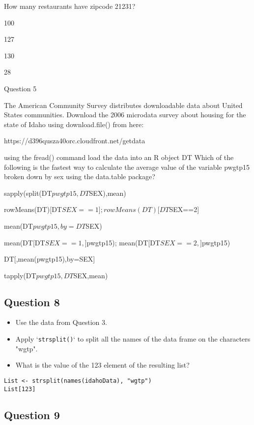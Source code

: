 \documentclass[]{article}
\begin{document}
How many restaurants have zipcode 21231? 


100 

127 

130 

28 


Question 5
 
The American Community Survey distributes downloadable data about United States communities. Download the 2006 microdata survey about housing for the state of Idaho using download.file() from here:
 
https://d396qusza40orc.cloudfront.net/getdata%

 using the fread() command load the data into an R object  DT  Which of the following is the fastest way to calculate the average value of the variable pwgtp15  broken down by sex using the data.table package? 

sapply(split(DT$pwgtp15,DT$SEX),mean) 

rowMeans(DT)[DT$SEX==1]; rowMeans(DT)[DT$SEX==2] 

mean(DT$pwgtp15,by=DT$SEX) 

mean(DT[DT$SEX==1,]$pwgtp15); mean(DT[DT$SEX==2,]$pwgtp15) 

DT[,mean(pwgtp15),by=SEX] 

tapply(DT$pwgtp15,DT$SEX,mean)

\newpage
\subsection*{Question 8}
\begin{itemize}
\item Use the data from Question 3.
\item Apply `\texttt{strsplit()}` to split all the names of the data frame on the characters "wgtp". 
\item What is the value of the 123 element of the resulting list?
\end{itemize}

\begin{framed} \begin{verbatim}
List <- strsplit(names(idahoData), "wgtp")
List[123]
\end{verbatim}\end{framed} 


\newpage
\subsection*{Question 9}
\end{document}
